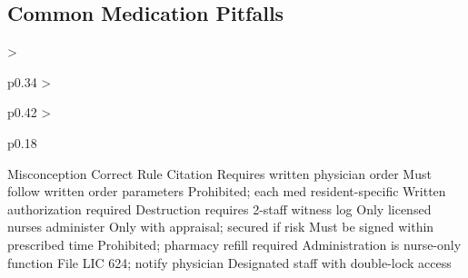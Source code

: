 \subsection{Common Medication Pitfalls}
\begin{cheattablethree}
  {>{\raggedright\arraybackslash}p{0.34\linewidth}
   >{\raggedright\arraybackslash}p{0.42\linewidth}
   >{\raggedright\arraybackslash}p{0.18\linewidth}}
  {Misconception}
  {Correct Rule}
  {Citation}
    {Requires written physician order}
    {}
    {Must follow written order parameters}
    {}
    {Prohibited; each med resident-specific}
    {}
    {Written authorization required}
    {}
    {Destruction requires 2-staff witness log}
    {}
    {Only licensed nurses administer}
    {}
    {Only with appraisal; secured if risk}
    {}
    {Must be signed within prescribed time}
    {}
    {Prohibited; pharmacy refill required}
    {}
    {Administration is nurse-only function}
    {}
    {File LIC 624; notify physician}
    {}
    {Designated staff with double-lock access}
    {}
\end{cheattablethree}
\clearpage
